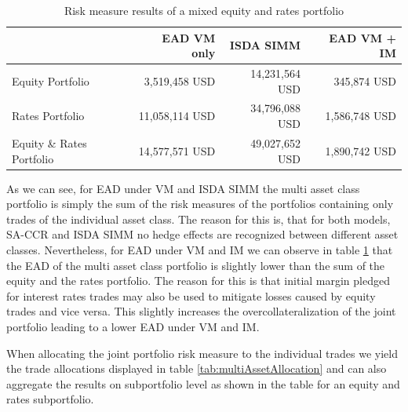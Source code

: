 \documentclass[../Thesis_AHoecherl.tex]{subfiles}
\begin{document}
    \begin{table}[htbp]
        \centering
        \begin{tabular}{l||r|r|r}
                & \gls{EAD} \gls{VM} only &\gls{ISDA SIMM} & \gls{EAD} \gls{VM} + \gls{IM} \\
                \toprule
        Equity Portfolio & 3,519,458 USD & 14,231,564 USD & 345,874 USD \\
        Rates Portfolio & 11,058,114 USD & 34,796,088 USD & 1,586,748 USD \\
        \midrule
        Equity \& Rates Portfolio & 14,577,571 USD & 49,027,652  USD & 1,890,742 USD \\
        \end{tabular}%
        \caption{Risk measure results of a mixed equity and rates portfolio}
        \label{tab:multiAssetResult}%
    \end{table}%

    As we can see, for \gls{EAD} under \gls{VM} and \gls{ISDA SIMM} the multi asset class portfolio is simply the sum of the risk measures of the portfolios containing only trades of the individual asset class.
    The reason for this is, that for both models, \gls{SA-CCR} and \gls{ISDA SIMM} no hedge effects are recognized between different asset classes.
    Nevertheless, for \gls{EAD} under \gls{VM} and \gls{IM} we can observe in table \ref{tab:multiAssetResult} that the \gls{EAD} of the multi asset class portfolio is slightly lower than the sum of the equity and the rates portfolio. 
    The reason for this is that initial margin pledged for interest rates trades may also be used to mitigate losses caused by equity trades and vice versa. This slightly increases the overcollateralization of the joint portfolio leading to a lower \gls{EAD} under \gls{VM} and IM.

    When allocating the joint portfolio risk measure to the individual trades we yield the trade allocations displayed in table \ref{tab:multiAssetAllocation} and can also aggregate the results on subportfolio level as shown in the table for an equity and rates subportfolio.
\end{document}
